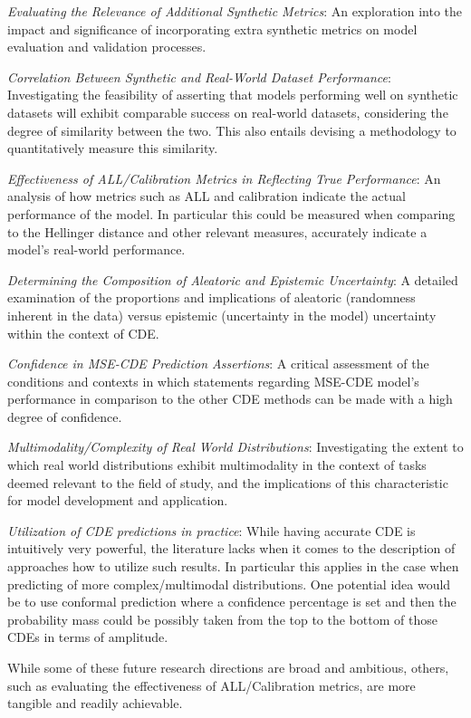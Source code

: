 \documentclass{article}
\begin{document}
\textit{Evaluating the Relevance of Additional Synthetic Metrics}: An exploration into the impact and significance of incorporating extra synthetic metrics on model evaluation and validation processes.

\textit{Correlation Between Synthetic and Real-World Dataset Performance}: Investigating the feasibility of asserting that models performing well on synthetic datasets will exhibit comparable success on real-world datasets, considering the degree of similarity between the two. This also entails devising a methodology to quantitatively measure this similarity.

\textit{Effectiveness of ALL/Calibration Metrics in Reflecting True Performance}: An analysis of how metrics such as ALL and calibration indicate the actual performance of the model. In particular this could be measured when comparing to the Hellinger distance and other relevant measures, accurately indicate a model's real-world performance.

\textit{Determining the Composition of Aleatoric and Epistemic Uncertainty}: A detailed examination of the proportions and implications of aleatoric (randomness inherent in the data) versus epistemic (uncertainty in the model) uncertainty within the context of CDE.

\textit{Confidence in MSE-CDE Prediction Assertions}: A critical assessment of the conditions and contexts in which statements regarding MSE-CDE model's performance in comparison to the other CDE methods can be made with a high degree of confidence.

\textit{Multimodality/Complexity of Real World Distributions}: Investigating the extent to which real world distributions exhibit multimodality in the context of tasks deemed relevant to the field of study, and the implications of this characteristic for model development and application.

\textit{Utilization of CDE predictions in practice}: While having accurate CDE is intuitively very powerful, the literature lacks when it comes to the description of approaches how to utilize such results. In particular this applies in the case when predicting of more complex/multimodal distributions. One potential idea would be to use conformal prediction \citep{shafer2008tutorial,balasubramanian2014conformal} where a confidence percentage is set and then the probability mass could be possibly taken from the top to the bottom of those CDEs in terms of amplitude.

While some of these future research directions are broad and ambitious, others, such as evaluating the effectiveness of ALL/Calibration metrics, are more tangible and readily achievable.
\end{document}
